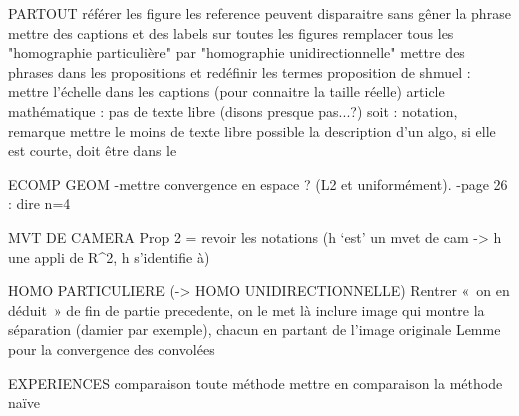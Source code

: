 PARTOUT
	référer les figure
	les reference peuvent disparaitre sans gêner la phrase
	mettre des captions et des labels sur toutes les figures
	remplacer tous les "homographie particulière" par "homographie unidirectionnelle"
	mettre des phrases dans les propositions et redéfinir les termes
	proposition de shmuel : mettre l'échelle dans les captions (pour connaitre la taille réelle)
	article mathématique : pas de texte libre (disons presque pas...?)
		soit : notation, remarque
	mettre le moins de texte libre possible
	la description d'un algo, si elle est courte, doit être dans le \caption


DECOMP GEOM 
	-mettre convergence en espace ? (L2 et uniformément).
	-page 26 : dire n=4


MVT DE CAMERA
	Prop 2 = revoir les notations (h ‘est’ un mvet de cam -> h une appli de R^2, h s'identifie à)


HOMO PARTICULIERE (-> HOMO UNIDIRECTIONNELLE)
	Rentrer « on en déduit » de fin de partie precedente, on le met là
	inclure image qui montre la séparation (damier par exemple), chacun en partant de l'image originale
	Lemme pour la convergence des convolées



EXPERIENCES
	comparaison toute méthode
	mettre en comparaison la méthode naïve
